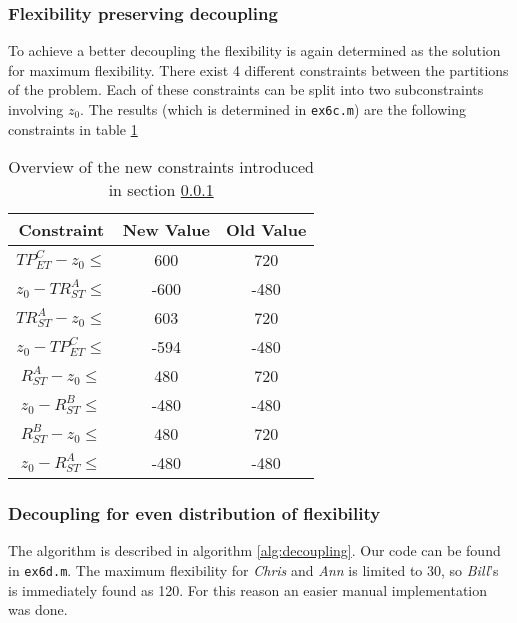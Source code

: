 \documentclass[10pt,a4paper]{article}
\begin{document}
\subsubsection{Flexibility preserving decoupling}
\label{sec:preserving_decoupling}
To achieve a better decoupling the flexibility is again determined as the solution for maximum flexibility. There exist 4 different constraints between the partitions of the problem. Each of these constraints can be split into two subconstraints involving $z_0$. The results (which is determined in \texttt{ex6c.m}) are the following constraints in table \ref{table:constraints}

\begin{table}
\centering
\begin{tabular}{ c | c | c }
Constraint & New Value & Old Value \\ \hline
$TP^C_{ET} - z_0 \leq $ & 600 & 720 \\
$z_0 - TR^A_{ST}\leq $ & -600 & -480 \\
$TR^A_{ST} - z_0\leq $ & 603 & 720 \\
$z_0 - TP^C_{ET}\leq $ & -594 & -480 \\
$R^A_{ST} - z_0 \leq $ & 480 & 720 \\
$z_0 - R^B_{ST} \leq $ & -480 & -480 \\
$R^B_{ST} - z_0\leq $ & 480 & 720 \\
$z_0 - R^A_{ST} \leq $ & -480 & -480
\end{tabular}
\caption{Overview of the new constraints introduced in section \ref{sec:preserving_decoupling}}
\label{table:constraints}
\end{table}

\subsubsection{Decoupling for even distribution of flexibility}
The algorithm is described in algorithm \ref{alg:decoupling}. Our code can be found in \texttt{ex6d.m}. The maximum flexibility for \emph{Chris} and \emph{Ann} is limited to 30, so \emph{Bill}'s is immediately found as 120. For this reason an easier manual implementation was done.
\end{document}
